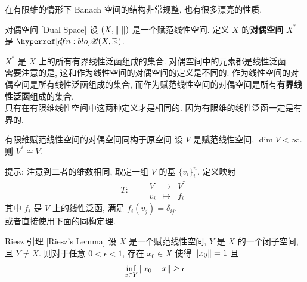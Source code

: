         \begin{intrormk}
            [Dedicatia]
            在有限维的情形下 Banach 空间的结构非常规整, 也有很多漂亮的性质.
        \end{intrormk}

        \begin{dfn}
            {对偶空间}
            [Dual Space]
            设 \((X, \norm{\cdot})\) 是一个赋范线性空间. 定义 \(X\) 的\textbf{对偶空间} \(X^*\) 是 \(\blo(X, \R)\).
        \end{dfn}

        \begin{rmk}
            [Dedicatia]
            \(X^*\) 是 \(X\) 上的所有有界线性泛函组成的集合. 对偶空间中的元素都是线性泛函. \\
            需要注意的是, 这和作为线性空间的对偶空间的定义是不同的. 作为线性空间的对偶空间是所有线性泛函组成的集合, 而作为赋范线性空间的对偶空间是所有\textbf{有界线性泛函}组成的集合.\\
            只有在有限维线性空间中这两种定义才是相同的. 因为有限维的线性泛函一定是有界的.
        \end{rmk}

        \begin{thm}
            {有限维赋范线性空间的对偶空间同构于原空间}
            设 \(V\) 是赋范线性空间, \(\dim V<\infty\). 则 \(V^*\cong V\).
        \end{thm}

        \begin{prf}
            提示: 注意到二者的维数相同, 取定一组 \(V\) 的基 \(\{v_i\}_i^n\). 定义映射
            \[T:\qquad\begin{matrix}
                V & \to & V^* \\
                v_i & \mapsto & f_i
            \end{matrix}\]
            其中 \(f_i\) 是 \(V\) 上的线性泛函, 满足 \(f_i(v_j)=\delta_{ij}\). \\
            或者直接使用下面的同构定理.
        \end{prf}

        \begin{thm}
            [riesz]
            {Riesz 引理}
            [Riesz's Lemma]
            设 \(X\) 是一个赋范线性空间, \(Y\) 是 \(X\) 的一个闭子空间, 且 \(Y\neq X\). 则对于任意 \(0<\epsilon<1\), 存在 \(x_0\in X\) 使得 \(\norm{x_0}=1\) 且 
            \[\inf_{x\in Y}\norm{x_0-x}\geq \epsilon\]
        \end{thm}

